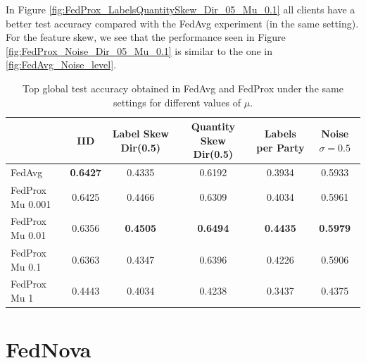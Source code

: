 In Figure \ref{fig:FedProx_LabelsQuantitySkew_Dir_05_Mu_0.1} all clients have a better test accuracy compared with the FedAvg experiment (in the same setting). For the feature skew, we see that the performance seen in Figure \ref{fig:FedProx_Noise_Dir_05_Mu_0.1} is similar to the one in \ref{fig:FedAvg_Noise_level}.

\begin{table}[h]
    \centering
    \begin{tabular}{lccccc}
        \toprule
        & IID & Label Skew Dir(0.5) & Quantity Skew Dir(0.5) & Labels per Party & Noise $\sigma = 0.5$ \\
        \midrule
        FedAvg & \textbf{0.6427} & 0.4335 & 0.6192 & 0.3934 & 0.5933 \\
        FedProx Mu 0.001 & 0.6425 & 0.4466 & 0.6309 & 0.4034 & 0.5961 \\
        FedProx Mu 0.01 & 0.6356 & \textbf{0.4505} & \textbf{0.6494} & \textbf{0.4435} & \textbf{0.5979} \\
        FedProx Mu 0.1 & 0.6363 & 0.4347 & 0.6396 & 0.4226 & 0.5906 \\
        FedProx Mu 1 & 0.4443 & 0.4034 & 0.4238 & 0.3437 & 0.4375 \\
        \bottomrule
    \end{tabular}
    \caption{Top global test accuracy obtained in FedAvg and FedProx under the same settings for different values of $\mu$.}
    \label{tab:accuracy}
\end{table}

\section{FedNova}

